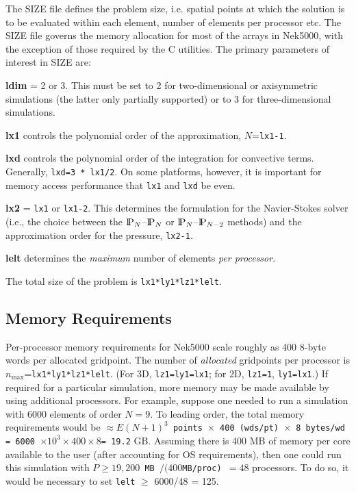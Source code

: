 The SIZE file defines the problem size, i.e. spatial points at which the solution is to be evaluated within each element, number of elements per processor etc.
The SIZE file governs the memory allocation for most of the arrays
in Nek5000, with the exception of those required by the C utilities.
The primary parameters of interest in SIZE are: 
\begin{description}
\item{\bf ldim} = 2 or 3.  This must be set to 2 for
two-dimensional or axisymmetric simulations  (the latter
only partially supported) or to 3 for three-dimensional simulations.
\item{\bf lx1} controls the polynomial order of the approximation,
$N$={\tt lx1-1}.
\item{\bf lxd} controls the polynomial order of the integration for
convective terms.  Generally, {\tt lxd=3 * lx1/2}.  On some platforms, however,
it is important for memory access performance that {\tt lx1} and {\tt lxd} be even.
\item{\bf lx2} = {\tt lx1} or {\tt lx1-2}.  This determines the formulation for
the Navier-Stokes solver (i.e., the choice between the $\PP_N$--$\PP_N$ 
or $\PP_N$--$\PP_{N-2}$ methods) and the approximation order for the
pressure, {\tt lx2-1}.
\item{\bf lelt} determines the {\em maximum} number of elements 
{\em per processor}.
\end{description}

The total size of the problem is {\tt lx1*ly1*lz1*lelt}.

\subsection{Memory Requirements}

Per-processor memory requirements for  Nek5000 scale
roughly as 400 8-byte words per allocated gridpoint.  The number
of {\em allocated} gridpoints per processor is 
$n_{\max}$={\tt lx1*ly1*lz1*lelt}.  
(For 3D, {\tt lz1=ly1=lx1}; for 2D, {\tt lz1=1}, {\tt ly1=lx1}.)  
If required for a particular simulation, more memory may be made
available by using additional processors.  For example, suppose
one needed to run a simulation with 6000 elements of order $N=9$.
To leading order, the total memory requirements would be
{\tt $\approx E(N+1)^3$ points $\times$ 400 (wds/pt) $\times$ 8 bytes/wd =
6000 $\times 10^3 \times 400 \times 8 $= 19.2} GB.  Assuming there
is 400 MB of memory per core available to the user (after accounting
for OS requirements), then one could run this simulation with
{\tt $P \ge 19,200$ \mbox{MB} $/( 400 $\mbox{MB/proc}) $= 48$} processors.
To do so, it would be necessary to set {\tt lelt} $\ge$ 6000/48 = 125.

